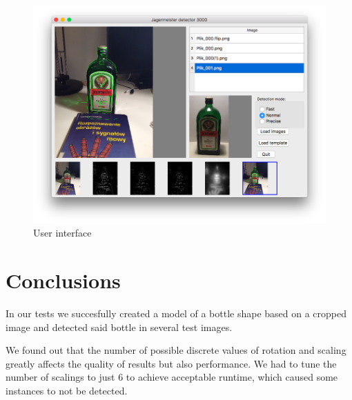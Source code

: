 \documentclass[letterpaper,12pt]{article}
\begin{document}
\begin{figure}[!ht]
\centering
\includegraphics[width = \textwidth]{ui}
\caption{User interface}
\end{figure}
\section{Conclusions}

In our tests we succesfully created a model of a bottle shape based on a cropped image and detected
said bottle in several test images.

We found out that the number of possible discrete values of rotation and scaling greatly affects
the quality of results but also performance.  We had to tune the number of scalings to just 6 to
achieve acceptable runtime, which caused some instances to not be detected.
\end{document}
